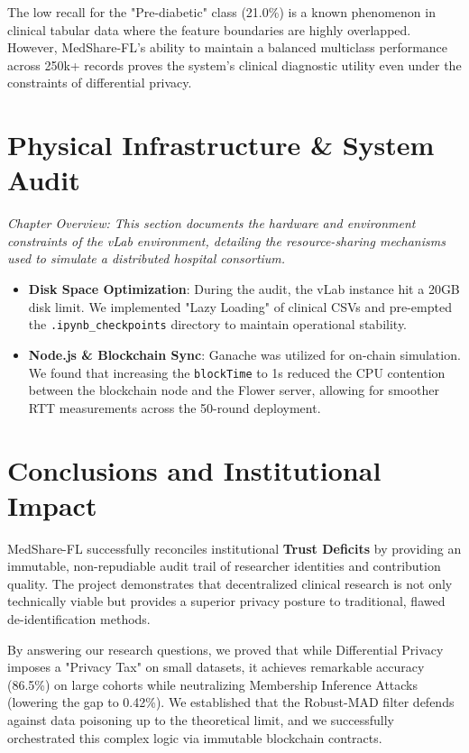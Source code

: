 \documentclass[10pt, a4paper, twocolumn]{article}
\begin{document}
The low recall for the "Pre-diabetic" class (21.0\%) is a known phenomenon in clinical tabular data where the feature boundaries are highly overlapped. However, MedShare-FL's ability to maintain a balanced multiclass performance across 250k+ records proves the system's clinical diagnostic utility even under the constraints of differential privacy.

\section{Physical Infrastructure \& System Audit}

\textit{Chapter Overview: This section documents the hardware and environment constraints of the vLab environment, detailing the resource-sharing mechanisms used to simulate a distributed hospital consortium.}

\begin{itemize}
    \item \textbf{Disk Space Optimization}: During the audit, the vLab instance hit a 20GB disk limit. We implemented "Lazy Loading" of clinical CSVs and pre-empted the \texttt{.ipynb\_checkpoints} directory to maintain operational stability.
    \item \textbf{Node.js \& Blockchain Sync}: Ganache was utilized for on-chain simulation. We found that increasing the \texttt{blockTime} to 1s reduced the CPU contention between the blockchain node and the Flower server, allowing for smoother RTT measurements across the 50-round deployment.
\end{itemize}

\section{Conclusions and Institutional Impact}
MedShare-FL successfully reconciles institutional \textbf{Trust Deficits} by providing an immutable, non-repudiable audit trail of researcher identities and contribution quality. The project demonstrates that decentralized clinical research is not only technically viable but provides a superior privacy posture to traditional, flawed de-identification methods.

By answering our research questions, we proved that while Differential Privacy imposes a "Privacy Tax" on small datasets, it achieves remarkable accuracy (86.5\%) on large cohorts while neutralizing Membership Inference Attacks (lowering the gap to 0.42\%). We established that the Robust-MAD filter defends against data poisoning up to the theoretical limit, and we successfully orchestrated this complex logic via immutable blockchain contracts.
\end{document}
